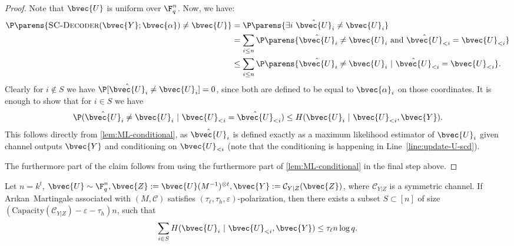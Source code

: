 \documentclass[11pt]{article}
\newcommand{\Arikan}{Ar\i kan}
\newcommand{\cC}{\mathcal{C}}
\newcommand{\two}{}
\begin{document}
\begin{proof}
	Note that $\bvec{U}$ is uniform over $\F_q^n$.
	Now, we have:
	\begin{align*}
		\P\parens{\textsc{SC-Decoder}(\bvec{Y}; \bvec{\alpha}) \not= \bvec{U}} & =
		\P\parens{\exists i~ \hat{\bvec{U}}_i \not= \bvec{U}_i} \\
		& = \sum_{i \leq n} \P\parens{\hat{\bvec{U}}_i \not= \bvec{U}_i \mbox{ and } \hat{\bvec{U}}_{<i} = \bvec{U}_{<i}} \\
		& \leq \sum_{i \leq n} \P\parens{\hat{\bvec{U}}_i \not= \bvec{U}_i ~|~ \hat{\bvec{U}}_{<i} = \bvec{U}_{<i}}.
	\end{align*}
	Clearly for $i \not\in S$ we have $\P[\hat{\bvec{U}}_i \not= \bvec{U}_i] = 0$, since both are defined to be equal to $\bvec{\alpha}_i$ on those coordinates. It is enough to show that for $i\in S$ we have
	\begin{equation*}
		\P(\hat{\bvec{U}}_i \not= \bvec{U}_i ~|~ \bvec{U}_{<i} = \hat{\bvec{U}}_{<i}) \leq H(\bvec{U}_i ~|~ \bvec{U}_{<i}, \bvec{Y}).
	\end{equation*}
	This follows directly from \cref{lem:ML-conditional}, as $\hat{\bvec{U}}_i$
	is defined exactly as a maximum likelihood estimator of $\bvec{U}_i$ given channel
	outputs $\bvec{Y}$ and conditioning on $\bvec{U}_{<i}$ (note that the conditioning is happening in Line~\ref{line:update-U-scd}).
	
	The furthermore part of the claim follows from using the furthermore part of \cref{lem:ML-conditional} in the final step above.
\end{proof}
\begin{claim}
	\label{clm:exist-S}
	Let $n=k^t$, $\bvec{U} \sim \F_q^n, \bvec{Z} := \bvec{U} (M^{-1})^{\otimes t}, \bvec{Y} := \cC_{Y|Z}(\bvec{Z})$, where $\cC_{Y|Z}$ is a symmetric channel.
	If \Arikan~Martingale associated with $(M, \cC)$  satisfies $(\tau_\ell, \tau_h, \varepsilon)$-polarization, then there
	exists a subset $S \subset [n]$ of size $(\mathrm{Capacity}(\cC_{Y|Z}) - \varepsilon
	- \two\tau_h) n$,
	such that
	\begin{equation*}
		\sum_{i \in S} H( \bvec{U}_{i} ~|~ \bvec{U}_{< i}, \bvec{Y}) \leq \tau_\ell n \log q.
	\end{equation*}
\end{claim}
\end{document}
